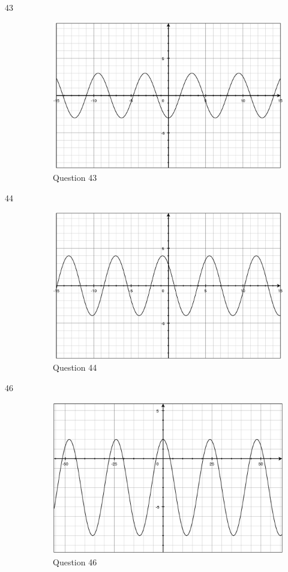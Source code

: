 \documentclass[fleqn,addpoints]{exam}
\begin{document}
\begin{description}
\item[43]
\begin{figure}[H]
  \centering
  \includegraphics[scale=.3]{question43.eps}
  \caption*{Question 43}
\end{figure}

\item[44]
\begin{figure}[H]
  \centering
  \includegraphics[scale=.3]{question44.eps}
  \caption*{Question 44}
\end{figure}

\item[46]
\begin{figure}[H]
  \centering
  \includegraphics[scale=.3]{question46.eps}
  \caption*{Question 46}
\end{figure}


\end{description}
\end{document}
